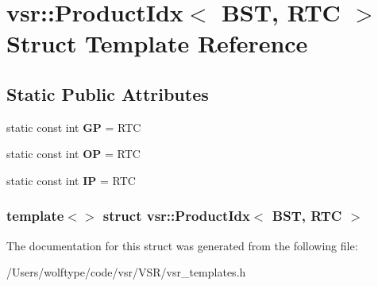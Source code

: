 \hypertarget{structvsr_1_1_product_idx_3_01_b_s_t_00_01_r_t_c_01_4}{\section{vsr\-:\-:Product\-Idx$<$ B\-S\-T, R\-T\-C $>$ Struct Template Reference}
\label{structvsr_1_1_product_idx_3_01_b_s_t_00_01_r_t_c_01_4}
}
\subsection*{Static Public Attributes}
\begin{DoxyCompactItemize}
\item 
\hypertarget{structvsr_1_1_product_idx_3_01_b_s_t_00_01_r_t_c_01_4_a50d01a0eba033cec2895413e9abb82dc}{static const int {\bfseries G\-P} = R\-T\-C}\label{structvsr_1_1_product_idx_3_01_b_s_t_00_01_r_t_c_01_4_a50d01a0eba033cec2895413e9abb82dc}

\item 
\hypertarget{structvsr_1_1_product_idx_3_01_b_s_t_00_01_r_t_c_01_4_ae6a2db402ac186eb72da67ed126a7b08}{static const int {\bfseries O\-P} = R\-T\-C}\label{structvsr_1_1_product_idx_3_01_b_s_t_00_01_r_t_c_01_4_ae6a2db402ac186eb72da67ed126a7b08}

\item 
\hypertarget{structvsr_1_1_product_idx_3_01_b_s_t_00_01_r_t_c_01_4_a88f4182dfdba1526a6200c4c39992c2b}{static const int {\bfseries I\-P} = R\-T\-C}\label{structvsr_1_1_product_idx_3_01_b_s_t_00_01_r_t_c_01_4_a88f4182dfdba1526a6200c4c39992c2b}

\end{DoxyCompactItemize}
\subsubsection*{template$<$$>$ struct vsr\-::\-Product\-Idx$<$ B\-S\-T, R\-T\-C $>$}



The documentation for this struct was generated from the following file\-:\begin{DoxyCompactItemize}
\item 
/\-Users/wolftype/code/vsr/\-V\-S\-R/vsr\-\_\-templates.\-h\end{DoxyCompactItemize}

